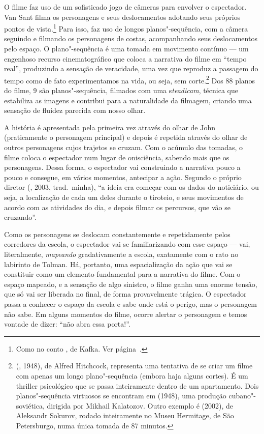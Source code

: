 O filme faz uso de um sofisticado jogo de câmeras para envolver o
espectador. Van Sant filma os personagens e seus deslocamentos adotando
seus próprios pontos de vista.\footnote{Como no conto {}, de Kafka. Ver página~\pageref{construcao}.} Para isso, faz uso
de longos planos"-sequência, com a câmera seguindo e filmando os
personagens de costas, acompanhando seus deslocamentos pelo espaço. O
plano"-sequência é uma tomada em movimento contínuo --- um engenhoso
recurso cinematográfico que coloca a narrativa do filme em ``tempo
real'', produzindo a sensação de veracidade, uma vez que reproduz a
passagem do tempo como de fato experimentamos na vida, ou seja, sem
corte.\footnote{{} ({}, 1948), de Alfred
  Hitchcock, representa uma tentativa de se criar um filme com apenas um
  longo plano"-sequência (embora haja alguns cortes). É um
  thriller psicológico que se passa inteiramente dentro de um
  apartamento. Dois planos"-sequência virtuosos se encontram em {} (1948), uma produção cubano"-soviética, dirigida por Mikhail
  Kalatozov. Outro exemplo é {} (2002), de Aleksandr
  Sokurov, rodado inteiramente no Museu Hermitage, de São Petersburgo,
  numa única tomada de 87 minutos.} Dos 88 planos do filme, 9 são
planos"-sequência, filmados com uma s\emph{teadicam}, técnica que
estabiliza as imagens e contribui para a naturalidade da filmagem,
criando uma sensação de fluidez parecida com nosso olhar.

A história é apresentada pela primeira vez através do olhar de John
(praticamente o personagem principal) e depois é repetida através do
olhar de outros personagens cujos trajetos se cruzam. Com o acúmulo das
tomadas, o filme coloca o espectador num lugar de onisciência, sabendo
mais que os personagens. Dessa forma, o espectador vai construindo a
narrativa pouco a pouco e consegue, em vários momentos, antecipar a
ação. Segundo o próprio diretor (, 2003, trad.~minha), ``a ideia
era começar com os dados do noticiário, ou seja, a localização de cada
um deles durante o tiroteio, e seus movimentos de acordo com as
atividades do dia, e depois filmar os percursos, que vão se cruzando''.

Como os personagens se deslocam constantemente e repetidamente pelos
corredores da escola, o espectador vai se familiarizando com esse espaço
--- vai, literalmente, \emph{mapeando} gradativamente a escola,
exatamente com o rato no labirinto de Tolman. Há, portanto, uma
espacialização da ação que vai se constituir como um elemento
fundamental para a narrativa do filme. Com o espaço mapeado, e a
sensação de algo sinistro, o filme ganha uma enorme tensão, que só vai
ser liberada no final, de forma provavelmente trágica. O espectador
passa a conhecer o espaço da escola e sabe onde está o perigo, mas o
personagem não sabe. Em alguns momentos do filme, ocorre alertar o
personagem e temos vontade de dizer: ``não abra essa porta!''.

